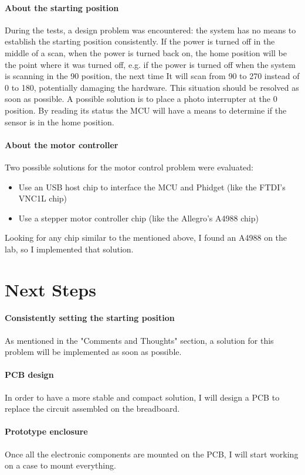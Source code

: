 \documentclass{article}
\begin{document}
\paragraph{About the starting position}
During the tests, a design problem was encountered: the system has no means to establish the starting position consistently. If the power is turned off in the middle of a scan, when the power is turned back on, the home position will be the point where it was turned off, e.g. if the power is turned off when the system is scanning in the 90 position, the next time It will scan from 90 to 270 instead of 0 to 180, potentially damaging the hardware. This situation should be resolved as soon as possible. A possible solution is to place a photo interrupter at the 0 position. By reading its status the MCU will have a means to determine if the sensor is in the home position.

\paragraph{About the motor controller}
Two possible solutions for the motor control problem were evaluated:
\begin{itemize}
    \item Use an USB host chip to interface the MCU and Phidget (like the FTDI's VNC1L chip)
    \item Use a stepper motor controller chip (like the Allegro's A4988 chip)
\end{itemize}
Looking for any chip similar to the mentioned above, I found an A4988 on the lab, so I implemented that solution.

\section{Next Steps}
\paragraph{Consistently setting the starting position}
As mentioned in the "Comments and Thoughts" section, a solution for this problem will be implemented as soon as possible.

\paragraph{PCB design}
In order to have a more stable and compact solution, I will design a PCB to replace the circuit assembled on the breadboard. 
\paragraph{Prototype enclosure}
Once all the electronic components are mounted on the PCB, I will start working on a case to mount everything.
\end{document}
